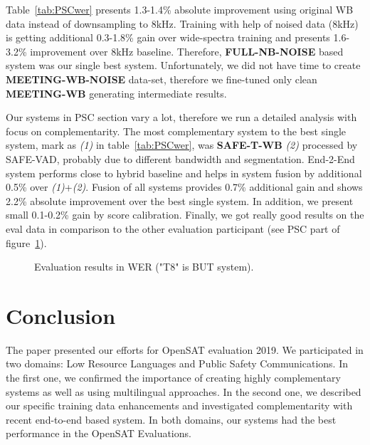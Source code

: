 \documentclass{article}
\begin{document}
Table~\ref{tab:PSCwer} presents 1.3-1.4\% absolute improvement using
original WB data instead of downsampling to 8kHz. Training with help of noised data (8kHz) is getting additional 0.3-1.8\% gain over wide-spectra training and presents 1.6-3.2\% improvement over 8kHz baseline. Therefore, {\bf FULL-NB-NOISE} based system was our single best system. Unfortunately, we did not have time to create {\bf MEETING-WB-NOISE} data-set, therefore we fine-tuned only clean {\bf MEETING-WB} generating intermediate results. 

Our systems in PSC section vary a lot, therefore we run a detailed
analysis with focus on complementarity. The most complementary system
to the best single system, mark as {\em (1)} in table~\ref{tab:PSCwer}, was {\bf SAFE-T-WB} {\em (2)} processed by
SAFE-VAD, probably due to different bandwidth and
segmentation. End-2-End system performs close to hybrid baseline and
helps in system fusion by additional 0.5\% over {\em(1)}+{\em(2)}. Fusion of all systems provides 0.7\% additional gain and shows 2.2\% absolute improvement over the best single system. In addition,
we present small 0.1-0.2\% gain by score calibration. Finally, we
got really good results on the eval data in comparison to the other evaluation participant (see PSC part of figure~\ref{fig:eval}).

\begin{figure}[tbh]
  \begin{center}
    \vspace{-10mm}
    \caption{Evaluation results in WER ("T8" is BUT system).}
    \label{fig:eval}
  \end{center}
  \vspace{-8mm}
\end{figure}

\section{Conclusion}

The paper presented our efforts for OpenSAT evaluation 2019. We
participated in two domains: Low Resource Languages and Public Safety
Communications. In the first one,  we confirmed the importance of creating
highly  complementary systems  as well as using multilingual approaches.
In the second one, we described our specific training data enhancements
and investigated complementarity with recent end-to-end based system. In
both domains, our systems had the best performance in the OpenSAT Evaluations.






\end{document}
